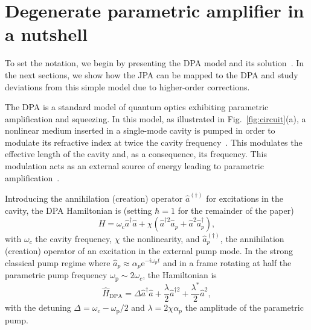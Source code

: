 \documentclass[pra,twocolumn,superscriptaddress]{revtex4-1}
\newcommand{\ah}[0]{\hat{a}}
\newcommand{\wpump}[0]{\omega_{\mathrm{p}}}
\newcommand{\parO}[1]{\left(#1\right)}
\newcommand{\erm}[0]{\mathrm{e}}
\begin{document}
\section{Degenerate parametric amplifier in a nutshell}
\label{sec::DPA}


To set the notation, we begin by presenting the DPA model and its solution~\cite{Gardiner:2004fk,Yurke:2006fk,Laflamme:2011vn}. In the next sections, we show how the JPA can be mapped to the DPA and study deviations from this simple model due to higher-order corrections. 
 
The DPA is a standard model of quantum optics exhibiting parametric amplification and squeezing. 
In this model, as illustrated in Fig.~\ref{fig:circuit}(a), a nonlinear medium inserted in a single-mode cavity is pumped in order to modulate its refractive index at twice the cavity frequency~\cite{Walls:2008fk}. 
This modulates the effective length of the cavity and, as a consequence, its frequency. 
This modulation acts as an external source of energy leading to parametric amplification~\cite{Landau:1969uq,Nation:2012fk}. 

Introducing the annihilation (creation) operator $\ah^{(\dag)}$ for excitations in the cavity, the DPA Hamiltonian is (setting $\hbar=1$ for the remainder of the paper)
\begin{equation}
	H = \omega_c \ah^\dag  \ah  + \chi \parO{\ah^{\dag 2} \ah_p + \ah^2 \ah^\dag_p},
\end{equation}
with $\omega_c$ the cavity frequency, $\chi$ the nonlinearity, and $\ah_p^{(\dag)}$, the annihilation (creation) operator of an excitation in the external pump mode.
% 
In the strong classical pump regime where $\ah_p \approx \alpha_p \erm^{-i \omega_p t}$ and in a frame rotating at half the parametric pump frequency $\wpump \sim 2 \omega_c$, the Hamiltonian is~\cite{Collett:1984kl,Walls:2008fk} 
% 
\begin{equation}
	\hat{H}_{\mathrm{DPA}} = \Delta \ah^\dagger \ah  + \frac{\lambda}{2} \ah^{\dagger 2} + \frac{\lambda^*}{2} \ah^2,
\end{equation}
% 
with the detuning $\Delta = \omega_{\mathrm{c}}- \wpump/2$ and $\lambda = 2 \chi \alpha_p$ the amplitude of the parametric pump.
\end{document}
